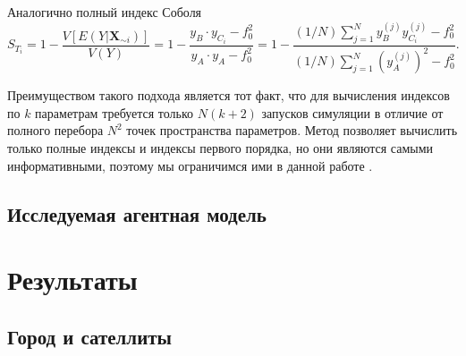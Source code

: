 \documentclass[a4paper,12pt]{article} %
\begin{document}
\begin{itemize}
Аналогично полный индекс Соболя
\begin{displaymath}
S_{T_i}=1-\frac{V[E(Y|\bm{X}_{\sim i})]}{V(Y)}=1-\frac{y_B\cdot y_{C_i}-f_0^2}{y_A\cdot y_A -f_0^2}=1-\frac{(1/N)\sum_{j=1}^N y_B^{(j)}y_{C_i}^{(j)} - f_0^2}{(1/N)\sum_{j=1}^N (y_A^{(j)})^2 - f_0^2}.
\end{displaymath}
\end{itemize}

Преимуществом такого подхода является тот факт, что для вычисления индексов по $k$ параметрам требуется только $N(k+2)$ запусков симуляции в отличие от полного перебора $N^2$ точек пространства параметров. Метод позволяет вычислить только полные индексы и индексы первого порядка, но они являются самыми информативными, поэтому мы ограничимся ими в данной работе \cite{saltelli2008global}.


\subsection{Исследуемая агентная модель}
\section{Результаты}
\subsection{Город и сателлиты}
\end{document}

